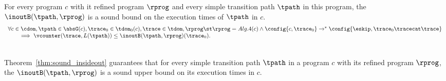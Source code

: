 %
\begin{thm}
  \label{thm:sound_insideout}
  For every program $c$ with it refined program $\rprog$ and 
  every simple transition path $\tpath$ in this program,
   the $\inoutB(\tpath, \rprog)$
is a sound bound on the execution times of $\tpath$ in $c$.
  \[
    \begin{array}{l}
    \forall c \in \cdom, \tpath \in \absG(c), \trace_0 \in \tdom_0(c), \trace \in \tdom, \rprog \st 
    \rprog = Alg.4(c)
    \land
    \config{c, \trace_0} \to^* 
    \config{{\eskip, \trace_0 \tracecat \trace}}
    \\ \qquad
    \implies
    \vcounter(\trace, L(\tpath)) \leq \inoutB(\tpath, \rprog)(\trace_0).
    \end{array}
    \]
\end{thm}
\\
Theorem~\ref{thm:sound_insideout} guarantees that
for every simple transition path $\tpath$ in a program $c$ with its refined program $\rprog$,
the $\inoutB(\tpath, \rprog)$
is a sound upper bound on its execution times in $c$.
%
